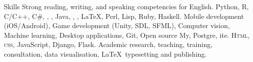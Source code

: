 
\begin{rubric}{Skills}
\entry*[Languages]
	Strong reading, writing, and speaking competencies for English.
	Python, R, C/C++, C\#, , , Java, ,
	, \LaTeX, Perl, Lisp, Ruby, Haskell.
	Mobile development (iOS/Android), Game development (Unity, SDL, SFML),
	Computer vision, Machine learning, Desktop applications, Git, Open source
\entry*[Databases]
	My, Postgre,  ite.
	\textsc{Html, css}, JavaScript, Django, Flask.
\entry*[Misc.]
	Academic research, teaching, training, consultation, data visualisation, \LaTeX\ typesetting and publishing.
\end{rubric}
